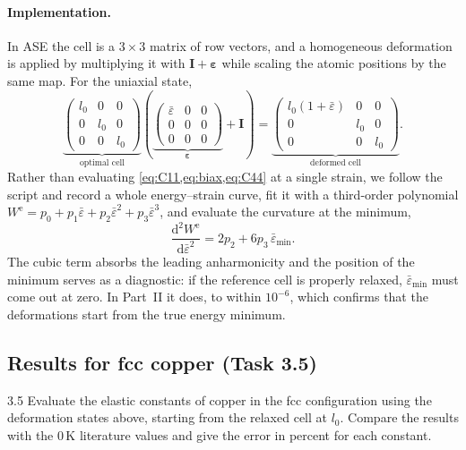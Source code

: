 \documentclass[11pt,a4paper]{article}
\numberwithin{equation}{section}
\theoremstyle{remark}
\newcommand{\beps}{\bm{\varepsilon}}
\newcommand{\bI}{\mathbf{I}}
\newcommand{\We}{W^{\mathrm{e}}}
\newcommand{\epsb}{\bar{\varepsilon}}
\begin{document}
\paragraph{Implementation.}
In ASE the cell is a $3\times3$ matrix of row vectors, and a homogeneous deformation is applied by
multiplying it with $\bI + \beps$ while scaling the atomic positions by the same map. For the uniaxial
state,
\begin{equation}\label{eq:celldef}
  \underbrace{\begin{pmatrix} l_0 & 0 & 0\\ 0 & l_0 & 0\\ 0&0&l_0\end{pmatrix}}_{\text{optimal cell}}
  \left(
  \underbrace{\begin{pmatrix} \epsb & 0 & 0\\ 0&0&0\\ 0&0&0\end{pmatrix}}_{\beps}
  + \bI \right)
  = \underbrace{\begin{pmatrix} l_0(1+\epsb) & 0 & 0\\ 0 & l_0 & 0\\ 0&0&l_0\end{pmatrix}}
    _{\text{deformed cell}} .
\end{equation}
Rather than evaluating \cref{eq:C11,eq:biax,eq:C44} at a single strain, we follow the script and record
a whole energy--strain curve, fit it with a third-order polynomial
$\We = p_0 + p_1\epsb + p_2\epsb^2 + p_3\epsb^3$, and evaluate the curvature at the minimum,
\begin{equation}\label{eq:d2W}
  \frac{\mathrm{d}^2\We}{\mathrm{d}\epsb^2} = 2p_2 + 6p_3\,\epsb_{\min}.
\end{equation}
The cubic term absorbs the leading anharmonicity and the position of the minimum serves as a diagnostic:
if the reference cell is properly relaxed, $\epsb_{\min}$ must come out at zero. In Part~II it does, to
within $10^{-6}$, which confirms that the deformations start from the true energy minimum.

\subsection{Results for fcc copper (Task 3.5)}\label{sec:results-elastic}

\begin{task}{3.5}
  Evaluate the elastic constants of copper in the fcc configuration using the deformation states above,
  starting from the relaxed cell at $l_0$. Compare the results with the 0\,K literature values and give
  the error in percent for each constant.
\end{task}
\end{document}
